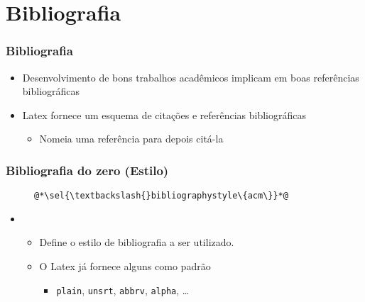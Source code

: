 \section{Bibliografia}

\begin{frame}[fragile] \frametitle{Bibliografia}
\begin{itemize}
	\item Desenvolvimento de bons trabalhos acadêmicos implicam em boas referências bibliográficas
	\item Latex fornece um esquema de citações e referências bibliográficas
	\begin{itemize}
		\item Nomeia uma referência para depois citá-la
	\end{itemize}
\end{itemize}
\end{frame}

\begin{frame}[fragile] \frametitle{Bibliografia do zero (Estilo)}
\begin{figure}[!t]
\begin{lstlisting}
@*\sel{\textbackslash{}bibliographystyle\{acm\}}*@

\end{lstlisting}
\end{figure}

\begin{itemize}
	\item {}
	\begin{itemize}
		\item Define o estilo de bibliografia a ser utilizado.
		\item O Latex já fornece alguns como padrão
		\begin{itemize}
			\item \texttt{plain}, \texttt{unsrt}, \texttt{abbrv}, \texttt{alpha}, \ldots
		\end{itemize}
	\end{itemize}
\end{itemize}
\end{frame}

